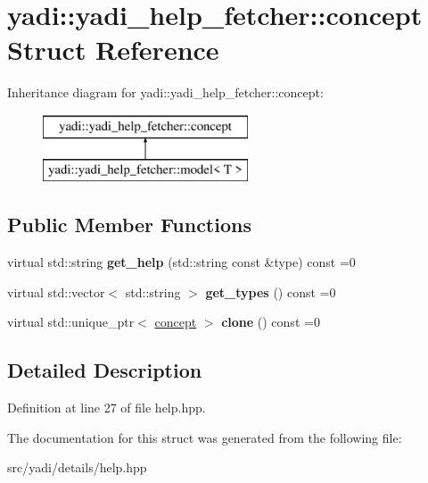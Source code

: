 \hypertarget{structyadi_1_1yadi__help__fetcher_1_1concept}{}\section{yadi\+:\+:yadi\+\_\+help\+\_\+fetcher\+:\+:concept Struct Reference}
\label{structyadi_1_1yadi__help__fetcher_1_1concept}
Inheritance diagram for yadi\+:\+:yadi\+\_\+help\+\_\+fetcher\+:\+:concept\+:\begin{figure}[H]
\begin{center}
\leavevmode
\includegraphics[height=2.000000cm]{structyadi_1_1yadi__help__fetcher_1_1concept}
\end{center}
\end{figure}
\subsection*{Public Member Functions}
\begin{DoxyCompactItemize}
\item 
\mbox{\label{structyadi_1_1yadi__help__fetcher_1_1concept_ab7a084fc27c22a1a6bbfec4489edc48b}} 
virtual std\+::string {\bfseries get\+\_\+help} (std\+::string const \&type) const =0
\item 
\mbox{\label{structyadi_1_1yadi__help__fetcher_1_1concept_a027d0a967be49fbde3b72dc0118b4f24}} 
virtual std\+::vector$<$ std\+::string $>$ {\bfseries get\+\_\+types} () const =0
\item 
\mbox{\label{structyadi_1_1yadi__help__fetcher_1_1concept_acdc0db89bdf6a26405c7d84c18a3a831}} 
virtual std\+::unique\+\_\+ptr$<$ \hyperlink{structyadi_1_1yadi__help__fetcher_1_1concept}{concept} $>$ {\bfseries clone} () const =0
\end{DoxyCompactItemize}


\subsection{Detailed Description}


Definition at line 27 of file help.\+hpp.



The documentation for this struct was generated from the following file\+:\begin{DoxyCompactItemize}
\item 
src/yadi/details/help.\+hpp\end{DoxyCompactItemize}
